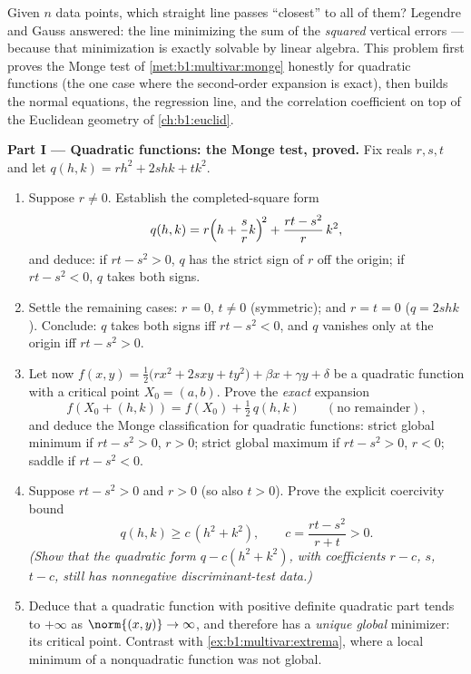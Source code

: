 \begin{problem}\label{pb:b1:multivar:1}
Given $n$ data points, which straight line passes ``closest'' to
all of them? Legendre and Gauss answered: the line minimizing the
sum of the \emph{squared} vertical errors --- because that
minimization is exactly solvable by linear algebra. This problem
first proves the Monge test of \cref{met:b1:multivar:monge}
honestly for quadratic functions (the one case where the
second-order expansion is exact), then builds the normal
equations, the regression line, and the correlation coefficient
on top of the Euclidean geometry of
\cref{ch:b1:euclid}.

\medskip
\noindent\textbf{Part I --- Quadratic functions: the Monge test,
proved.} Fix reals $r, s, t$ and let $q(h, k) = r h^2 + 2s hk +
t k^2$.
\begin{enumerate}
  \item Suppose $r \neq 0$. Establish the completed-square form
        \[
        q(h, k) = r\Bigl(h + \frac{s}{r}k\Bigr)^{\!2}
        + \frac{rt - s^2}{r}\,k^2 ,
        \]
        and deduce: if $rt - s^2 > 0$, $q$ has the strict sign
        of $r$ off the origin; if $rt - s^2 < 0$, $q$ takes both
        signs.
  \item Settle the remaining cases: $r = 0$, $t \neq 0$
        (symmetric); and $r = t = 0$ ($q = 2shk$). Conclude:
        $q$ takes both signs iff $rt - s^2 < 0$, and $q$
        vanishes only at the origin iff $rt - s^2 > 0$.
  \item Let now $f(x, y) = \frac12\bigl(r x^2 + 2s xy + t
        y^2\bigr) + \beta x + \gamma y + \delta$ be a quadratic
        function with a critical point $X_0 = (a, b)$. Prove the
        \emph{exact} expansion
        \[
        f(X_0 + (h,k)) = f(X_0) + \tfrac12\,q(h, k)
        \qquad (\text{no remainder}),
        \]
        and deduce the Monge classification for quadratic
        functions: strict global minimum if $rt - s^2 > 0$, $r >
        0$; strict global maximum if $rt - s^2 > 0$, $r < 0$;
        saddle if $rt - s^2 < 0$.
  \item Suppose $rt - s^2 > 0$ and $r > 0$ (so also $t > 0$).
        Prove the explicit coercivity bound
        \[
        q(h, k) \geq c\,(h^2 + k^2),
        \qquad
        c = \frac{rt - s^2}{r + t} > 0 .
        \]
        \emph{(Show that the quadratic form $q - c(h^2 + k^2)$,
        with coefficients $r - c$, $s$, $t - c$, still has
        nonnegative discriminant-test data.)}
  \item Deduce that a quadratic function with positive definite
        quadratic part tends to $+\infty$ as $\norm{(x,y)} \to
        \infty$, and therefore has a \emph{unique global}
        minimizer: its critical point. Contrast with
        \cref{ex:b1:multivar:extrema}, where a local minimum of
        a nonquadratic function was not global.
\end{enumerate}


\end{problem}

